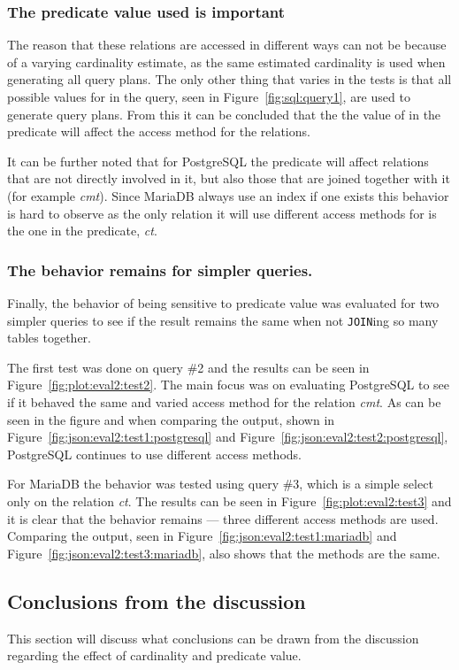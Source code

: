 \subsubsection{The predicate value used is important}
The reason that these relations are accessed in different ways can not be
because of a varying cardinality estimate, as the same estimated cardinality is
used when generating all query plans. The only other thing that varies in the
tests is that all possible values for  in the query, seen in
Figure~\ref{fig:sql:query1}, are used to generate query plans. From this it can
be concluded that the the value of  in the predicate  will affect the access method for the relations.

It can be further noted that for PostgreSQL the predicate will affect relations
that are not directly involved in it, but also those that are joined together
with it (for example \textit{cmt}). Since MariaDB always use an index if one
exists this behavior is hard to observe as the only relation it will use
different access methods for is the one in the predicate, \textit{ct}.

\subsubsection{The behavior remains for simpler queries.}
Finally, the behavior of being sensitive to predicate value was evaluated for
two simpler queries to see if the result remains the same when not
\texttt{JOIN}ing so many tables together.

The first test was done on query \#2 and the results can be seen in
Figure~\ref{fig:plot:eval2:test2}. The main focus was on evaluating PostgreSQL
to see if it behaved the same and varied access method for the relation
\textit{cmt}. As can be seen in the figure and when comparing the output, shown
in Figure~\ref{fig:json:eval2:test1:postgresql} and
Figure~\ref{fig:json:eval2:test2:postgresql}, PostgreSQL continues to use
different access methods.

For MariaDB the behavior was tested using query \#3, which is a simple select
only on the relation \textit{ct}. The results can be seen in
Figure~\ref{fig:plot:eval2:test3} and it is clear that the behavior remains ---
three different access methods are used. Comparing the output, seen in
Figure~\ref{fig:json:eval2:test1:mariadb} and
Figure~\ref{fig:json:eval2:test3:mariadb}, also shows that the methods are the
same.

\subsection{Conclusions from the discussion}
This section will discuss what conclusions can be drawn from the discussion
regarding the effect of cardinality and predicate value.

